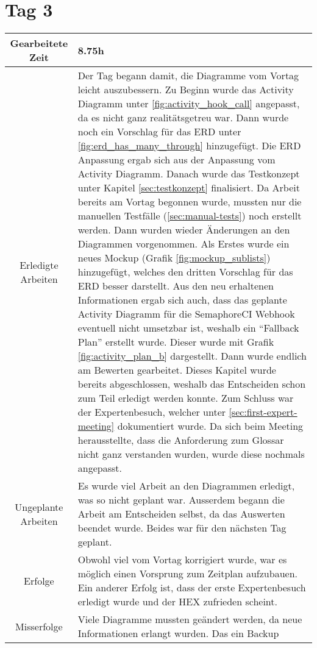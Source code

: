\section{Tag 3}
\begin{tabularx}{\textwidth}[H]{|c|X|}
  \hline
  Gearbeitete Zeit & 8.75h \\ \hline
  Erledigte Arbeiten & Der Tag begann damit, die Diagramme vom Vortag leicht auszubessern. Zu
  Beginn wurde das Activity Diagramm unter \ref{fig:activity_hook_call} angepasst, da es nicht
  ganz realitätsgetreu war. Dann wurde noch ein Vorschlag für das ERD unter
  \ref{fig:erd_has_many_through} hinzugefügt. Die ERD Anpassung ergab sich aus der Anpassung
  vom Activity Diagramm. \newline
  Danach wurde das Testkonzept unter Kapitel \ref{sec:testkonzept} finalisiert. Da Arbeit bereits
  am Vortag begonnen wurde, mussten nur die manuellen Testfälle (\ref{sec:manual-tests}) noch erstellt
  werden. \newline
  Dann wurden wieder Änderungen an den Diagrammen vorgenommen. Als Erstes wurde ein neues Mockup
  (Grafik \ref{fig:mockup_sublists}) hinzugefügt, welches den dritten Vorschlag für das ERD
  besser darstellt. Aus den neu erhaltenen Informationen ergab sich auch, dass das geplante Activity Diagramm
  für die SemaphoreCI Webhook eventuell nicht umsetzbar ist, weshalb ein \enquote{Fallback Plan}
  erstellt wurde. Dieser wurde mit Grafik \ref{fig:activity_plan_b} dargestellt. \newline
  Dann wurde endlich am Bewerten gearbeitet. Dieses Kapitel wurde bereits abgeschlossen, weshalb
  das Entscheiden schon zum Teil erledigt werden konnte. \newline
  Zum Schluss war der Expertenbesuch, welcher unter \ref{sec:first-expert-meeting} dokumentiert wurde.
  Da sich beim Meeting herausstellte, dass die Anforderung zum Glossar nicht ganz verstanden wurden,
  wurde diese nochmals angepasst. \\ \hline
  Ungeplante Arbeiten & Es wurde viel Arbeit an den Diagrammen erledigt, was so nicht geplant war. Ausserdem
  begann die Arbeit am Entscheiden selbst, da das Auswerten beendet wurde. Beides war für den nächsten Tag
  geplant. \\ \hline
  Erfolge & Obwohl viel vom Vortag korrigiert wurde, war es möglich einen Vorsprung zum Zeitplan aufzubauen.
  Ein anderer Erfolg ist, dass der erste Expertenbesuch erledigt wurde und der HEX zufrieden scheint. \\ \hline
  Misserfolge & Viele Diagramme mussten geändert werden, da neue Informationen erlangt wurden. Das ein Backup

\end{tabularx}
